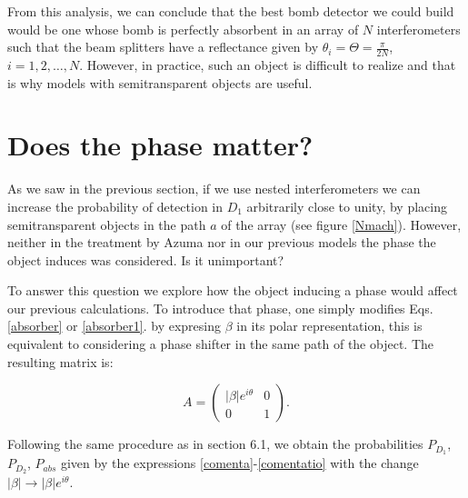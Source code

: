 \documentclass[12pt]{book}
\begin{document}
From this analysis, we can conclude that the best bomb detector we could build would be one whose bomb is perfectly absorbent in an array of $N$ interferometers such that the beam splitters have a reflectance given by $\theta_{i}=\Theta=\frac{\pi}{2 N}$, $i=1,2,\dots,N$. However, in practice, such an object is difficult to realize and that is why models with semitransparent objects are useful.
 

\section{Does the phase matter?}

As we saw in the previous section, if we use nested interferometers we can increase the probability of detection in $D_{1}$ arbitrarily close to unity, by placing semitransparent objects in the path $a$ of the array (see figure \ref{Nmach}). However, neither in the treatment by Azuma \cite{Azuma} nor in our previous models the phase the object induces was considered. Is it unimportant?

To answer this question we explore how the object inducing a phase would affect our previous calculations. To introduce that phase, one simply modifies Eqs. \ref{absorber} or \ref{absorber1}. by expresing $\beta$ in its polar representation, this is equivalent to considering a phase shifter in the same path of the object. The resulting matrix is:

\begin{equation}
 A=\begin{pmatrix} |\beta| e^{i \theta}& 0\\0&  1\end{pmatrix}.
 \end{equation}

Following the same procedure as in section 6.1, we obtain the probabilities $P_{D_{1}}$, $P_{D_{2}}$, $P_{abs}$ given by the expressions \ref{comenta}-\ref{comentatio} with the change $|\beta|\xrightarrow{}|\beta|e^{i\theta}$.
\end{document}
